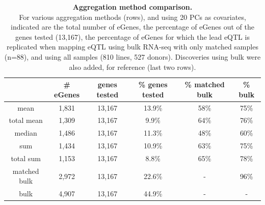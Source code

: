 




\begin{table}[h]
    \centering
    \begin{tabular}{c|c c c c c}
    & \# eGenes & genes tested & \% genes tested & \% matched bulk  & \% bulk   \\
    \hline
    mean         &  1,831 & 13,167 & 13.9\% & 58\% & 75\% \\
    total mean   &  1,309 & 13,167 &  9.9\% & 64\% & 76\% \\
    median       &  1,486 & 13,167 & 11.3\% & 48\% & 60\% \\
    sum          &  1,434 & 13,167 & 10.9\% & 63\% & 75\% \\
    total sum    &  1,153 & 13,167 &  8.8\% & 65\% & 78\% \\
    matched bulk &  2,972 & 13,167 & 22.6\% & - & 96\% \\
    bulk         &  4,907 & 13,167 & 44.9\% & - & - \\
    \end{tabular}
    \caption[Aggregation method comparison]{\textbf{Aggregation method comparison.}\\
    For various aggregation methods (rows), and using 20 PCs as covariates, indicated are the total number of eGenes, the percentage of eGenes out of the genes tested (13,167), the percentage of eGenes for which the lead eQTL is replicated when mapping eQTL using bulk RNA-seq with only matched samples (n=88), and using all samples (810 lines, 527 donors).
    Discoveries using bulk were also added, for reference (last two rows).}
    \label{tab:egenes}
\end{table}



